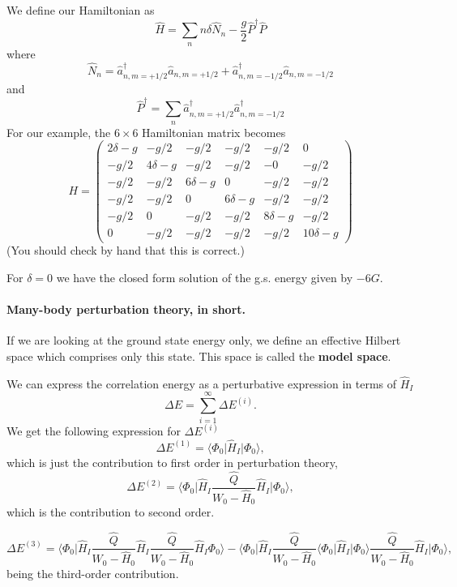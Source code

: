 \documentclass[%
twoside,                 %
final,                   %
10pt]{article}
\begin{document}
\noindent
We define our Hamiltonian as
\[
\hat{H} = \sum_n n \delta \hat{N}_n  - \frac{g}{2} \hat{P}^\dagger \hat{P}
\]
where 
\[
\hat{N}_n = \hat{a}^\dagger_{n, m=+1/2} \hat{a}_{n, m=+1/2} +
\hat{a}^\dagger_{n, m=-1/2} \hat{a}_{n, m=-1/2}
\]
and
\[
\hat{P}^\dagger = \sum_{n} \hat{a}^\dagger_{n, m=+1/2} \hat{a}^\dagger_{n, m=-1/2} 
\]
For our example, the $ 6 \times 6$  Hamiltonian matrix becomes
\[
H = \left ( 
\begin{array}{cccccc}
2\delta -g & -g/2 & -g/2 & -g/2 & -g/2 & 0 \\
 -g/2 & 4\delta -g & -g/2 & -g/2 & -0 & -g/2 \\
-g/2 & -g/2 & 6\delta -g & 0 & -g/2 & -g/2 \\
 -g/2 & -g/2 & 0 & 6\delta-g & -g/2 & -g/2 \\
 -g/2 & 0 & -g/2 & -g/2 & 8\delta-g & -g/2 \\
0 & -g/2 & -g/2 & -g/2 & -g/2 & 10\delta -g 
\end{array} \right )
\]
(You should check by hand that this is correct.) 

For $\delta = 0$ we have the closed form solution of  the g.s. energy given by $-6G$.





\paragraph{Many-body perturbation theory, in short.}
If we are looking at the ground state energy only, we define an effective Hilbert space which comprises only this state. This space is called the \textbf{model space}.

We can express the correlation energy as a perturbative expression in terms
of $\hat{H}_I$ 
\[
\Delta E=\sum_{i=1}^{\infty}\Delta E^{(i)}.
\]
We get the following expression for $\Delta E^{(i)}$
\[
\Delta E^{(1)}=\langle \Phi_0\vert \hat{H}_I\vert \Phi_0\rangle,
\] 
which is just the contribution to first order in perturbation theory,
\[
\Delta E^{(2)}=\langle\Phi_0\vert \hat{H}_I\frac{\hat{Q}}{W_0-\hat{H}_0}\hat{H}_I\vert \Phi_0\rangle, 
\]
which is the contribution to second order.



\[
\Delta E^{(3)}=\langle \Phi_0\vert \hat{H}_I\frac{\hat{Q}}{W_0-\hat{H}_0}\hat{H}_I\frac{\hat{Q}}{W_0-\hat{H}_0}\hat{H}_I\Phi_0\rangle-
\langle\Phi_0\vert \hat{H}_I\frac{\hat{Q}}{W_0-\hat{H}_0}\langle \Phi_0\vert \hat{H}_I\vert \Phi_0\rangle\frac{\hat{Q}}{W_0-\hat{H}_0}\hat{H}_I\vert \Phi_0\rangle,
\]
being the third-order contribution. 
\end{document}
